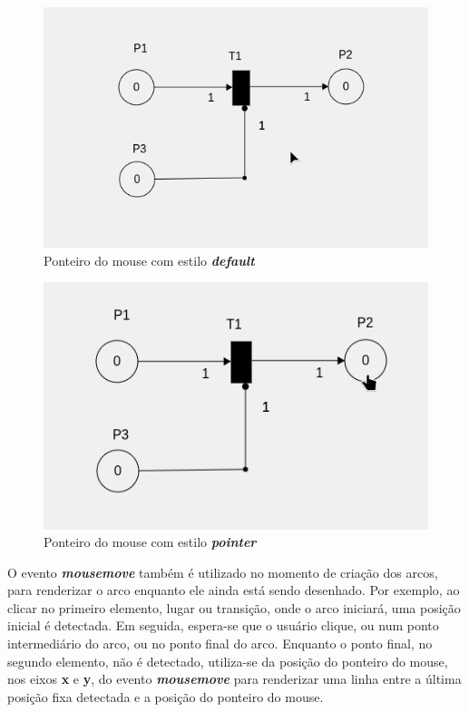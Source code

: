 \documentclass[
	12pt,				%
	openright,			%
	oneside,			%
	a4paper,			%
	english,			%
	brazil				%
	]{abntex2}
\theoremstyle{doispontos}
\begin{document}
\begin{figure}[ht] 
	\centering
	\includegraphics[scale=0.4]{figuras/mouse_estilo_default.png}
	\caption[Mouse estilo default]{Ponteiro do mouse com estilo \textbf{\textit{default}}}
	\label{fig:mouse_estilo_default}
\end{figure}
\FloatBarrier

\begin{figure}[ht] 
	\centering
	\includegraphics[scale=0.4]{figuras/mouse_estilo_pointer.png}
	\caption[Mouse estilo default]{Ponteiro do mouse com estilo \textbf{\textit{pointer}}}
	\label{fig:mouse_estilo_pointer}
\end{figure}
\FloatBarrier

O evento \textbf{\textit{mousemove}} também é utilizado no momento de criação dos arcos, para renderizar o arco enquanto ele ainda está sendo desenhado. Por exemplo, ao clicar no primeiro elemento, lugar ou transição, onde o arco iniciará, uma posição inicial é detectada. Em seguida, espera-se que o usuário clique, ou num ponto intermediário do arco, ou no ponto final do arco. Enquanto o ponto final, no segundo elemento, não é detectado, utiliza-se da posição do ponteiro do mouse, nos eixos \textbf{x} e \textbf{y}, do evento \textbf{\textit{mousemove}} para renderizar uma linha entre a última posição fixa detectada e a posição do ponteiro do mouse.
\end{document}
